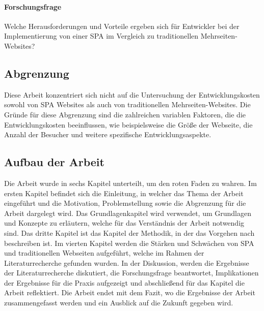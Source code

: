 \paragraph*{Forschungsfrage}
Welche Herausforderungen und Vorteile ergeben sich für Entwickler bei der Implementierung von einer \ac{SPA} im Vergleich zu traditionellen Mehrseiten-Websites?

\subsection{Abgrenzung}
Diese Arbeit konzentriert sich nicht auf die Untersuchung der Entwicklungskosten sowohl von \ac{SPA} Websites als auch von traditionellen Mehrseiten-Websites. 
Die Gründe für diese Abgrenzung sind die zahlreichen variablen Faktoren, die die Entwicklungskosten beeinflussen, wie beispielsweise die Größe der Webseite, die Anzahl der Besucher und weitere spezifische Entwicklungsaspekte.
\subsection{Aufbau der Arbeit}

Die Arbeit wurde in sechs Kapitel unterteilt, um den roten Faden zu wahren.
Im ersten Kapitel befindet sich die Einleitung, in welcher das Thema der Arbeit eingeführt und die Motivation, Problemstellung sowie die Abgrenzung für die Arbeit dargelegt wird.
Das Grundlagenkapitel wird verwendet, um Grundlagen und Konzepte zu erläutern, welche für das Verständnis der Arbeit notwendig sind.
Das dritte Kapitel ist das Kapitel der Methodik, in der das Vorgehen nach  beschreiben ist.
Im vierten Kapitel werden die Stärken und Schwächen von \ac{SPA} und traditionellen Webseiten aufgeführt, welche im Rahmen der Literaturrecherche gefunden wurden.
In der Diskussion, werden die Ergebnisse der Literaturrecherche diskutiert, die Forschungsfrage beantwortet, Implikationen der Ergebnisse für die Praxis aufgezeigt und abschließend für das Kapitel die Arbeit reflektiert.
Die Arbeit endet mit dem Fazit, wo die Ergebnisse der Arbeit zusammengefasst werden und ein Ausblick auf die Zukunft gegeben wird.
